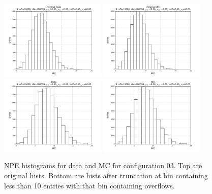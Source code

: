  \begin{figure}[htbp] \begin{center} 
\includegraphics[width=0.45\textwidth]{../FIGURES/03/FIG_Original_Data.pdf} 
\includegraphics[width=0.45\textwidth]{../FIGURES/03/FIG_Original_MC.pdf} 
\includegraphics[width=0.45\textwidth]{../FIGURES/03/FIG_Data.pdf} 
\includegraphics[width=0.45\textwidth]{../FIGURES/03/FIG_MC.pdf} 
\caption{NPE histograms for data and MC for configuration 03. Top are original hists. Bottom are hists after truncation at bin containing less than 10 entries with that bin containing overflows.} 
\label{tab:npe_03} 
\end{center} \end{figure} 

 